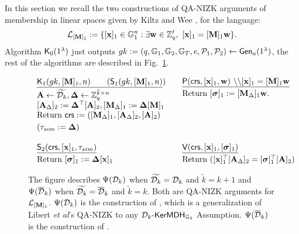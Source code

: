 In this section we recall the two constructions of QA-NIZK arguments of membership in linear spaces given by 
Kiltz and Wee \cite{EC:KilWee15}, for the language:
 $$\mathcal{L}_{[\mathbf{{M}}]_1}:=\{ [\mathbf{x}]_1 \in \mathbb{G}_1^{n}:  \exists \mathbf{w} \in \mathbb{Z}_q^{t}, \  [\mathbf{x}]_1=[\mathbf{{M}}]_1\mathbf{w} \}.$$ 
\noindent Algorithm $\mathsf{K}_0(1^\lambda)$ just outputs $gk := (q,\mathbb{G}_1,\mathbb{G}_2,\mathbb{G}_T,e,\mathcal{P}_1,\mathcal{P}_2) \leftarrow \mathsf{Gen}_a(1^{\lambda})$, the rest of the algorithms are described in Fig.~\ref{fig:QANIZKlinear}. 

\begin{figure} 
$$
\begin{array}{ll}
\begin{array}{l}
\underline{\algK_1(gk,[\matr{M}]_1,n) \qquad  (\mathsf{S}_1(gk,[\matr{M}]_1,n)})\\[.1cm]

\matr{A} \gets \widetilde{\dist_{k}}, \matr{\Delta} \gets \Z_q^{\tilde{k} \times n}\\
{[\matr{A}_{\Delta}]_2:= \matr{\Delta}^\top[\matr{A}]_2, [\matr{M}_{\Delta}]_1:=\matr{\Delta} [\matr{M}]_1} \\
\text{Return} \ \mathsf{crs}:=([\matr{M}_{\Delta}]_1, [\matr{A}_\Delta]_2, [\matr{A}]_2)\\ [.1cm]
(\tau_{sim}:=\matr{\Delta})
\end{array}
&
\begin{array}{l}
\underline{\algP(\mathsf{crs},[\vecb{x}]_1, \vecb{w}) \  \backslash \backslash [\vecb{x}]_1=[\matr{M}]_1 \vecb{w}} \\[.1cm]

 \text{Return } [\grkb{\sigma}]_1:=[\matr{M}_{\Delta}]_1 \vecb{w}.
\\
\\
\\
\vspace*{.2cm}
\end{array}
\\
\\
\begin{array}{l}
\underline{\mathsf{S}_2(\crs,[\vecb{x}]_1,\tau_{sim})}   \\ [.1cm]
  \text{Return} \ [\grkb{\sigma}]_1:= \matr{\Delta} [\vecb{x}]_1
\end{array}
&
\begin{array}{l}
\underline{\algV(\mathsf{crs},[\vecb{x}]_1,[\grkb{\sigma}]_1)}\\ [.1cm]
\text{Return} \ ([\vecb{x}]_1^\top [\matr{A}_\Delta]_2 = [\grkb{\sigma}]_1^\top[\matr{A}]_2)
\end{array}
\end{array}
$$
\caption{The figure describes $\ps$ when $\widetilde{\dist_{k}}=\dist_k$ and  $\tilde{k}=k+1$ and $\psws$ when $\widetilde{\dist_{k}}=\overline{\dist}_k$ and  $\tilde{k}=k$. Both are QA-NIZK arguments for $\mathcal{L}_{[\matr{M}]_1}$. 
$\ps$  is the construction of \cite[Sect.~3.1]{EC:KilWee15},
  which is a generalization 
of Libert \textit{et al}'s QA-NIZK \cite{EC:LPJY14} to any $\dist_k\mbox{-}\fmdh_{\Hr}$ Assumption. $\psws$ is the construction of  \cite[Sect.\ 3.2.]{EC:KilWee15}%
  .}
\label{fig:QANIZKlinear}
\end{figure}

